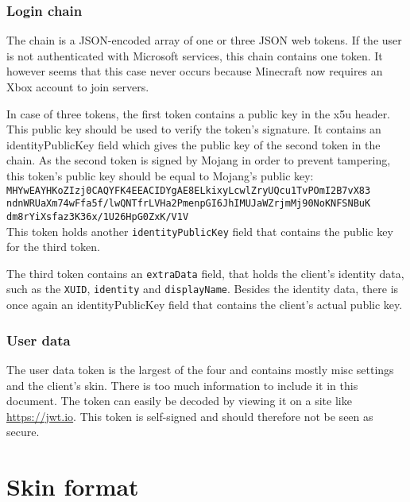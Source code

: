 
\subsubsection{Login chain}\label{subsubsec:login-chain}

The chain is a JSON-encoded array of one or three JSON web tokens.
If the user is not authenticated with Microsoft services, this chain contains one token.
It however seems that this case never occurs because Minecraft now requires an Xbox account to join servers.

In case of three tokens, the first token contains a public key in the x5u header.
This public key should be used to verify the token's signature.
It contains an identityPublicKey field which gives the public key of the second token in the chain.
As the second token is signed by Mojang in order to prevent tampering, 
this token's public key should be equal to Mojang's public key: \\

\noindent
\texttt{MHYwEAYHKoZIzj0CAQYFK4EEACIDYgAE8ELkixyLcwlZryUQcu1TvPOmI2B7vX83\\ndnWRUaXm74wFfa5f/lwQNTfrLVHa2PmenpGI6JhIMUJaWZrjmMj90NoKNFSNBuK\\dm8rYiXsfaz3K36x/1U26HpG0ZxK/V1V}
\\

\noindent
This token holds another \texttt{identityPublicKey} field that contains the public key for the third token.

The third token contains an \texttt{extraData} field, that holds the client's identity data,
such as the \texttt{XUID}, \texttt{identity} and \texttt{displayName}.
Besides the identity data, there is once again an identityPublicKey field that contains the client's actual public key.

\subsubsection{User data}\label{subsubsec:user-data}

The user data token is the largest of the four and contains mostly misc settings and the client's skin.
There is too much information to include it in this document. The token can easily be decoded by viewing it on a site like \url{https://jwt.io}.
This token is self-signed and should therefore not be seen as secure.


\section{Skin format}\label{sec:protocol-skin}